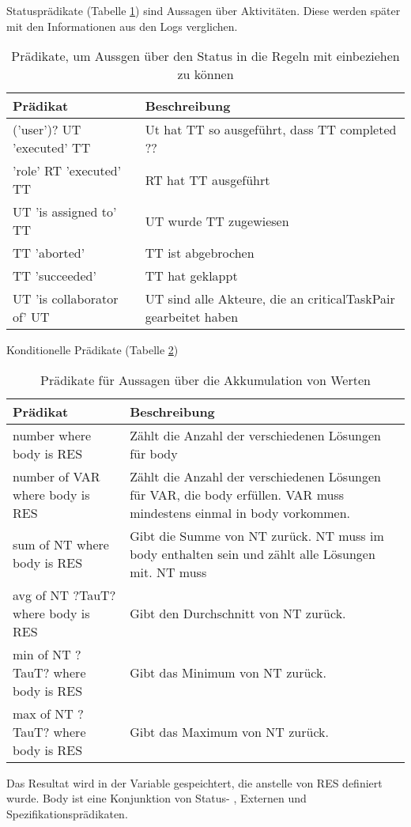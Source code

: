 Statusprädikate (Tabelle \ref{tab:status}) sind Aussagen über Aktivitäten. Diese werden später mit den Informationen aus den Logs verglichen. 
\begin{table}[h]
\begin{tabular} {|p{6cm}|p{10cm}|}
\hline
\textbf{Prädikat} & \textbf{Beschreibung}\\
\hline
('user')? UT 'executed' TT      & Ut hat TT so ausgeführt, dass TT completed ??\\
\hline
'role' RT 'executed' TT		& RT hat TT ausgeführt\\
\hline
UT 'is assigned to' TT		& UT wurde TT zugewiesen\\
\hline
TT 'aborted'			& TT ist abgebrochen\\
\hline
TT 'succeeded'			& TT hat geklappt \\
\hline
UT 'is collaborator of' UT	& UT sind alle Akteure, die an criticalTaskPair gearbeitet haben\\
\hline
\end{tabular}
\caption{Prädikate, um Aussgen über den Status in die Regeln mit einbeziehen zu können}
\label{tab:status}
\end{table}

Konditionelle Prädikate (Tabelle \ref{tab:conditional})
\begin{table}[h]
\begin{tabular} {|p{6cm}|p{10cm}|}
\hline
\textbf{Prädikat} & \textbf{Beschreibung}\\
\hline
number where body is RES		& Zählt die Anzahl der verschiedenen Lösungen für body \\
\hline
number of VAR where body is RES	& Zählt die Anzahl der verschiedenen Lösungen für VAR, die body erfüllen. VAR muss mindestens einmal in body vorkommen.\\
\hline
sum of NT where body is RES		& Gibt die Summe von NT zurück. NT muss im body enthalten sein und zählt alle Lösungen mit. NT muss\\
\hline
avg of NT ?TauT? where body is RES		& Gibt den Durchschnitt von NT zurück.\\
\hline
min of NT ?TauT? where body is RES		& Gibt das Minimum von NT zurück.\\
\hline
max of NT ?TauT? where body is RES		& Gibt das Maximum von NT zurück.\\
\hline
\end{tabular}
Das Resultat wird in der Variable gespeichtert, die anstelle von RES definiert wurde. Body ist eine Konjunktion von Status- , Externen und Spezifikationsprädikaten.
\caption{Prädikate für Aussagen über die Akkumulation von Werten}
\label{tab:conditional}
\end{table}



